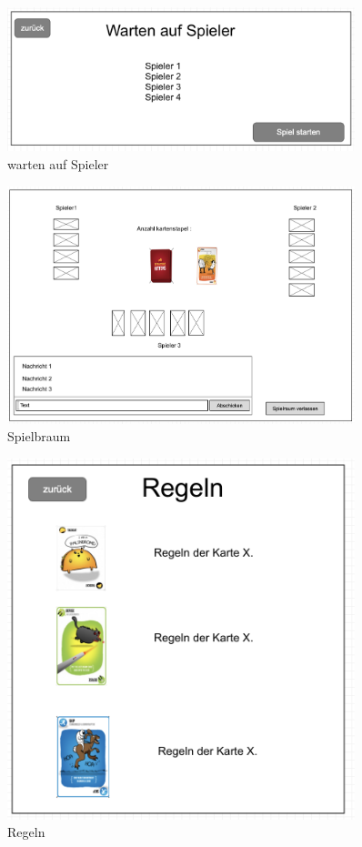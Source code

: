 \begin{figure}
	\centering
	\includegraphics[width=0.9\textwidth]{img/Warten}
	\caption{warten auf Spieler}
	\label{gui:wartebereich}

\end{figure}

\begin{figure}
	\centering
	\includegraphics[width=0.9\textwidth]{img/Spielbrett}
	\caption{Spielbraum}
	\label{gui:spielbrett}
\end{figure}

\begin{figure}
	\centering
	\includegraphics[width=0.9\textwidth]{img/Regeln}
	\caption{Regeln}
	\label{gui:regeln}
\end{figure}


